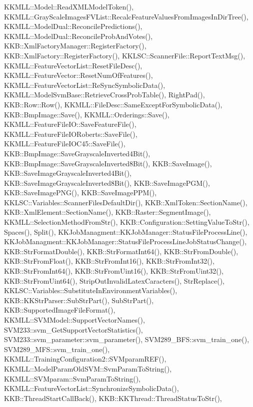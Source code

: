 K\+K\+M\+L\+L\+::\+Model\+::\+Read\+X\+M\+L\+Model\+Token(), K\+K\+M\+L\+L\+::\+Gray\+Scale\+Images\+F\+V\+List\+::\+Recalc\+Feature\+Values\+From\+Images\+In\+Dir\+Tree(), K\+K\+M\+L\+L\+::\+Model\+Dual\+::\+Reconcile\+Predictions(), K\+K\+M\+L\+L\+::\+Model\+Dual\+::\+Reconcile\+Prob\+And\+Votes(), K\+K\+B\+::\+Xml\+Factory\+Manager\+::\+Register\+Factory(), K\+K\+B\+::\+Xml\+Factory\+::\+Register\+Factory(), K\+K\+L\+S\+C\+::\+Scanner\+File\+::\+Report\+Text\+Msg(), K\+K\+M\+L\+L\+::\+Feature\+Vector\+List\+::\+Reset\+File\+Desc(), K\+K\+M\+L\+L\+::\+Feature\+Vector\+::\+Reset\+Num\+Of\+Features(), K\+K\+M\+L\+L\+::\+Feature\+Vector\+List\+::\+Re\+Sync\+Symbolic\+Data(), K\+K\+M\+L\+L\+::\+Model\+Svm\+Base\+::\+Retrieve\+Cross\+Prob\+Table(), Right\+Pad(), K\+K\+B\+::\+Row\+::\+Row(), K\+K\+M\+L\+L\+::\+File\+Desc\+::\+Same\+Except\+For\+Symbolic\+Data(), K\+K\+B\+::\+Bmp\+Image\+::\+Save(), K\+K\+M\+L\+L\+::\+Orderings\+::\+Save(), K\+K\+M\+L\+L\+::\+Feature\+File\+I\+O\+::\+Save\+Feature\+File(), K\+K\+M\+L\+L\+::\+Feature\+File\+I\+O\+Roberts\+::\+Save\+File(), K\+K\+M\+L\+L\+::\+Feature\+File\+I\+O\+C45\+::\+Save\+File(), K\+K\+B\+::\+Bmp\+Image\+::\+Save\+Grayscale\+Inverted4\+Bit(), K\+K\+B\+::\+Bmp\+Image\+::\+Save\+Grayscale\+Inverted8\+Bit(), K\+K\+B\+::\+Save\+Image(), K\+K\+B\+::\+Save\+Image\+Grayscale\+Inverted4\+Bit(), K\+K\+B\+::\+Save\+Image\+Grayscale\+Inverted8\+Bit(), K\+K\+B\+::\+Save\+Image\+P\+G\+M(), K\+K\+B\+::\+Save\+Image\+P\+N\+G(), K\+K\+B\+::\+Save\+Image\+P\+P\+M(), K\+K\+L\+S\+C\+::\+Variables\+::\+Scanner\+Files\+Default\+Dir(), K\+K\+B\+::\+Xml\+Token\+::\+Section\+Name(), K\+K\+B\+::\+Xml\+Element\+::\+Section\+Name(), K\+K\+B\+::\+Raster\+::\+Segment\+Image(), K\+K\+M\+L\+L\+::\+Selection\+Method\+From\+Str(), K\+K\+B\+::\+Configuration\+::\+Setting\+Value\+To\+Str(), Spaces(), Split(), K\+K\+Job\+Managment\+::\+K\+K\+Job\+Manager\+::\+Status\+File\+Process\+Line(), K\+K\+Job\+Managment\+::\+K\+K\+Job\+Manager\+::\+Status\+File\+Process\+Line\+Job\+Status\+Change(), K\+K\+B\+::\+Str\+Format\+Double(), K\+K\+B\+::\+Str\+Format\+Int64(), K\+K\+B\+::\+Str\+From\+Double(), K\+K\+B\+::\+Str\+From\+Float(), K\+K\+B\+::\+Str\+From\+Int16(), K\+K\+B\+::\+Str\+From\+Int32(), K\+K\+B\+::\+Str\+From\+Int64(), K\+K\+B\+::\+Str\+From\+Uint16(), K\+K\+B\+::\+Str\+From\+Uint32(), K\+K\+B\+::\+Str\+From\+Uint64(), Strip\+Out\+Invalid\+Latex\+Caracters(), Str\+Replace(), K\+K\+L\+S\+C\+::\+Variables\+::\+Substitute\+In\+Environment\+Variables(), K\+K\+B\+::\+K\+K\+Str\+Parser\+::\+Sub\+Str\+Part(), Sub\+Str\+Part(), K\+K\+B\+::\+Supported\+Image\+File\+Format(), K\+K\+M\+L\+L\+::\+S\+V\+M\+Model\+::\+Support\+Vector\+Names(), S\+V\+M233\+::svm\+\_\+\+Get\+Support\+Vector\+Statistics(), S\+V\+M233\+::svm\+\_\+parameter\+::svm\+\_\+parameter(), S\+V\+M289\+\_\+\+B\+F\+S\+::svm\+\_\+train\+\_\+one(), S\+V\+M289\+\_\+\+M\+F\+S\+::svm\+\_\+train\+\_\+one(), K\+K\+M\+L\+L\+::\+Training\+Configuration2\+::\+S\+V\+Mparam\+R\+E\+F(), K\+K\+M\+L\+L\+::\+Model\+Param\+Old\+S\+V\+M\+::\+Svm\+Param\+To\+String(), K\+K\+M\+L\+L\+::\+S\+V\+Mparam\+::\+Svm\+Param\+To\+String(), K\+K\+M\+L\+L\+::\+Feature\+Vector\+List\+::\+Synchronize\+Symbolic\+Data(), K\+K\+B\+::\+Thread\+Start\+Call\+Back(), K\+K\+B\+::\+K\+K\+Thread\+::\+Thread\+Status\+To\+Str(), 